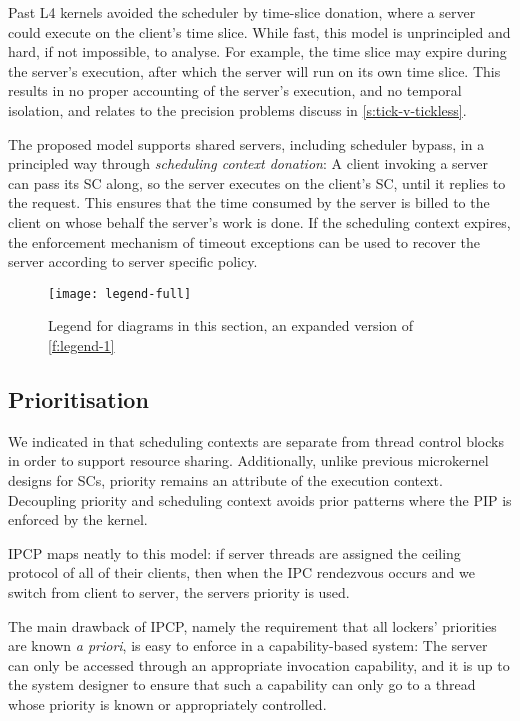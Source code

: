 Past L4 kernels avoided the scheduler by time-slice donation, where a
server could execute on the client's time slice. While fast, this
model is unprincipled and hard, if not impossible, to
analyse. For example, the time slice may expire during the server's
execution, after which the server will run on its own time slice.
This results in no proper accounting of the server's execution, and no temporal isolation, and
relates to the precision problems discuss in \cref{s:tick-v-tickless}.

The proposed model supports shared servers, including scheduler
bypass, in a principled way through \emph{scheduling context
donation}: A client invoking a server can pass its SC along, so the
server executes on the client's SC, until it replies to the
request. This ensures that the time consumed by the server is billed
to the client on whose behalf the server's work is done. If the scheduling context 
expires, the enforcement mechanism of timeout exceptions can be used to recover the server according 
to server specific policy.

\begin{figure}
    \centering
    \texttt{[image: legend-full]}
    \caption{Legend for diagrams in this section, an expanded version of \cref{f:legend-1}}
    \label{f:legend-2}
\end{figure}

\subsection{Prioritisation}

We indicated in  that scheduling contexts are separate from thread control blocks in
order to support resource sharing. Additionally, unlike previous microkernel designs for \glspl{SC}, priority
remains an attribute of the execution context. Decoupling priority and scheduling context avoids
prior patterns where the \gls{PIP} is enforced by the kernel. 

\Gls{IPCP} maps neatly to this model: if server threads are assigned the ceiling protocol of all of
their clients, then when the \gls{IPC} rendezvous occurs and we switch from client to server, the
servers priority is used.

The main drawback of \gls{IPCP}, namely the requirement that all
lockers' priorities are known \emph{a priori}, is easy to enforce in a
capability-based system: The server can only be accessed through an
appropriate invocation capability, and it is up to the system designer
to ensure that such a capability can only go to a thread whose
priority is known or appropriately controlled.

